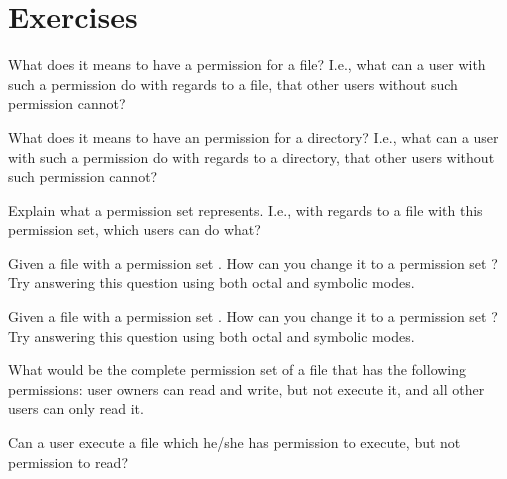 \section*{Exercises}

\begin{exercises}
  \item What does it means to have a  permission for a file? I.e., what can a user with such a permission do with regards to a file, that other users without such permission cannot?
  \item What does it means to have an  permission for a directory? I.e., what can a user with such a permission do with regards to a directory, that other users without such permission cannot?
  \item Explain what a permission set  represents. I.e., with regards to a file with this permission set, which users can do what?
  \item Given a file with a permission set . How can you change it to a permission set ? Try answering this question using both octal and symbolic modes.
  \item Given a file with a permission set . How can you change it to a permission set ? Try answering this question using both octal and symbolic modes.
  \item What would be the complete permission set of a file that has the following permissions: user owners can read and write, but not execute it, and all other users can only read it.
  \item Can a user execute a file which he/she has permission to execute, but not permission to read?
\end{exercises}